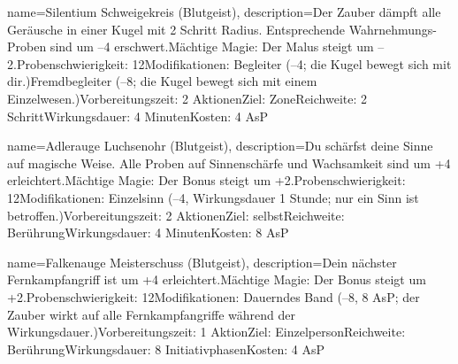 {
    name={Silentium Schweigekreis (Blutgeist)},
    description={Der Zauber dämpft alle Geräusche in einer Kugel mit 2 Schritt Radius. Entsprechende Wahrnehmungs-Proben sind um –4 erschwert.\newline Mächtige Magie: Der Malus steigt um –2.\newline Probenschwierigkeit: 12\newline Modifikationen: Begleiter (–4; die Kugel bewegt sich mit dir.)\newline Fremdbegleiter (–8; die Kugel bewegt sich mit einem Einzelwesen.)\newline Vorbereitungszeit: 2 Aktionen\newline Ziel: Zone\newline Reichweite: 2 Schritt\newline Wirkungsdauer: 4 Minuten\newline Kosten: 4 AsP}
}


{
    name={Adlerauge Luchsenohr (Blutgeist)},
    description={Du schärfst deine Sinne auf magische Weise. Alle Proben auf Sinnenschärfe und Wachsamkeit sind um +4 erleichtert.\newline Mächtige Magie: Der Bonus steigt um +2.\newline Probenschwierigkeit: 12\newline Modifikationen: Einzelsinn (–4, Wirkungsdauer 1 Stunde; nur ein Sinn ist betroffen.)\newline Vorbereitungszeit: 2 Aktionen\newline Ziel: selbst\newline Reichweite: Berührung\newline Wirkungsdauer: 4 Minuten\newline Kosten: 8 AsP}
}


{
    name={Falkenauge Meisterschuss (Blutgeist)},
    description={Dein nächster Fernkampfangriff ist um +4 erleichtert.\newline Mächtige Magie: Der Bonus steigt um +2.\newline Probenschwierigkeit: 12\newline Modifikationen: Dauerndes Band (–8, 8 AsP; der Zauber wirkt auf alle Fernkampfangriffe während der Wirkungsdauer.)\newline Vorbereitungszeit: 1 Aktion\newline Ziel: Einzelperson\newline Reichweite: Berührung\newline Wirkungsdauer: 8 Initiativphasen\newline Kosten: 4 AsP}
}


